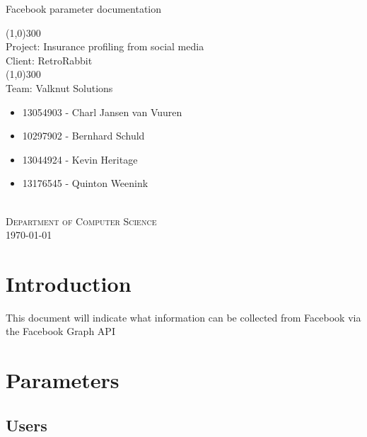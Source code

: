 \documentclass{article}
\begin{document}
	\begin{titlepage}
		\begin{center}
			\huge{
			Facebook parameter documentation\\
			}
			
			\line(1,0){300}\\
			[0.2cm]
			\LARGE{Project: Insurance profiling from social media\\
			Client: RetroRabbit} \\
			\line(1,0){300}\\
			\LARGE{Team: Valknut Solutions}\\
			[1.0cm]
			\large
			{
			\begin{itemize}
				\item 13054903 - Charl Jansen van Vuuren 
				\item 10297902 - Bernhard Schuld      
				\item 13044924 - Kevin Heritage
				\item 13176545 - Quinton Weenink\\
			\end{itemize}
			}
			\textsc{\large}\\
		[3.0cm]
		\textsc{\large  Department of Computer Science}\\
		[0.5cm]
		\textsc{\large \today}\\
		\end{center}

	\end{titlepage}
	\cleardoublepage
	\tableofcontents
\section{Introduction}
This document will indicate what information can be collected from Facebook via the Facebook Graph API
\section{Parameters}
	\subsection{Users}
\end{document}
